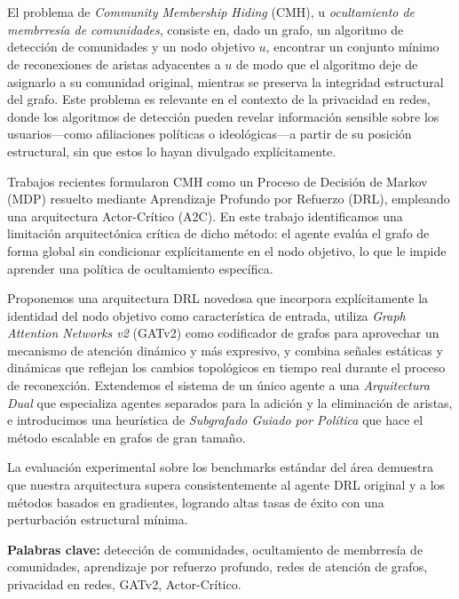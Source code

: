 \chapter*{\runtitulo}

\noindent
El problema de \emph{Community Membership Hiding} (CMH), u \emph{ocultamiento de
membrres\'ia de comunidades}, consiste en, dado un grafo, un algoritmo de detecci\'on
de comunidades y un nodo objetivo $u$, encontrar un conjunto m\'inimo de reconexiones
de aristas adyacentes a $u$ de modo que el algoritmo deje de asignarlo a su comunidad
original, mientras se preserva la integridad estructural del grafo.
Este problema es relevante en el contexto de la privacidad en redes, donde los
algoritmos de detecci\'on pueden revelar informaci\'on sensible sobre los usuarios---como
afiliaciones pol\'iticas o ideol\'ogicas---a partir de su posici\'on estructural, sin
que estos lo hayan divulgado expl\'icitamente.

Trabajos recientes formularon CMH como un Proceso de Decisi\'on de Markov (MDP) resuelto
mediante Aprendizaje Profundo por Refuerzo (DRL), empleando una arquitectura
Actor-Cr\'itico (A2C). En este trabajo identificamos una limitaci\'on arquitect\'onica
cr\'itica de dicho m\'etodo: el agente eval\'ua el grafo de forma global sin condicionar
expl\'icitamente en el nodo objetivo, lo que le impide aprender una pol\'itica de
ocultamiento espec\'ifica.

Proponemos una arquitectura DRL novedosa que incorpora expl\'icitamente la identidad del
nodo objetivo como caracter\'istica de entrada, utiliza \emph{Graph Attention Networks v2}
(GATv2) como codificador de grafos para aprovechar un mecanismo de atenci\'on din\'amico
y m\'as expresivo, y combina se\~nales est\'aticas y din\'amicas que reflejan los cambios
topol\'ogicos en tiempo real durante el proceso de reconexci\'on.
Extendemos el sistema de un \'unico agente a una \emph{Arquitectura Dual} que especializa
agentes separados para la adici\'on y la eliminaci\'on de aristas, e introducimos una
heur\'istica de \emph{Subgrafado Guiado por Pol\'itica} que hace el m\'etodo escalable
en grafos de gran tama\~no.

La evaluaci\'on experimental sobre los benchmarks est\'andar del \'area demuestra que
nuestra arquitectura supera consistentemente al agente DRL original y a los m\'etodos
basados en gradientes, logrando altas tasas de \'exito con una perturbaci\'on estructural
m\'inima.

\bigskip

\noindent\textbf{Palabras clave:} detecci\'on de comunidades, ocultamiento de
membrres\'ia de comunidades, aprendizaje por refuerzo profundo, redes de atenci\'on de
grafos, privacidad en redes, GATv2, Actor-Cr\'itico.
